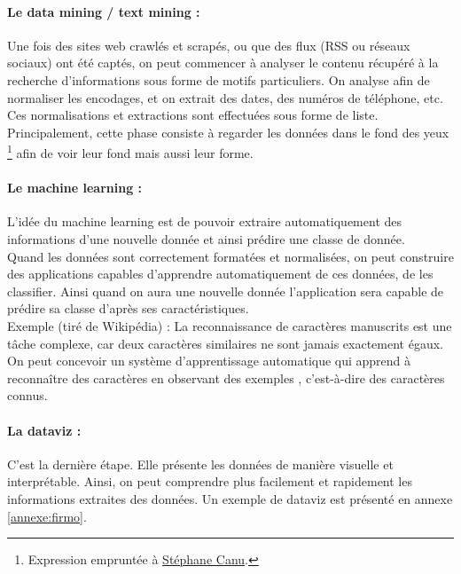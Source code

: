             \paragraph{Le data mining / text mining :}
                Une fois des sites web crawlés et scrapés, ou que des flux (RSS ou réseaux sociaux) ont été captés, on peut commencer à analyser le contenu récupéré à la recherche d'informations sous forme de motifs particuliers. On analyse afin de normaliser les encodages, et on extrait des dates, des numéros de téléphone, etc. Ces normalisations et extractions sont effectuées sous forme de liste.\\
                Principalement, cette phase consiste à regarder les données \og dans le fond des yeux \fg \footnote{Expression empruntée à \href{http://asi.insa-rouen.fr/enseignants/~scanu/}{Stéphane Canu}.} afin de voir leur fond mais aussi leur forme.

            \paragraph{Le machine learning :}
                L'idée du machine learning est de pouvoir extraire automatiquement des informations d'une nouvelle donnée et ainsi prédire une classe de donnée.\\
                Quand les données sont correctement formatées et normalisées, on peut construire des applications capables d'apprendre automatiquement de ces données, de les classifier. Ainsi quand on aura une nouvelle donnée l'application sera capable de prédire sa classe d'après ses caractéristiques.\\
                Exemple (tiré de Wikipédia\autocite{wiki_ml}) : La reconnaissance de caractères manuscrits est une tâche complexe, car deux caractères similaires ne sont jamais exactement égaux. On peut concevoir un système d'apprentissage automatique qui apprend à reconnaître des caractères en observant des \og exemples \fg, c'est-à-dire des caractères connus.

            \paragraph{La dataviz :}
                C'est la dernière étape. Elle présente les données de manière visuelle et interprétable. Ainsi, on peut comprendre plus facilement et rapidement les informations extraites des données. Un exemple de dataviz est présenté en annexe \ref{annexe:firmo}.

